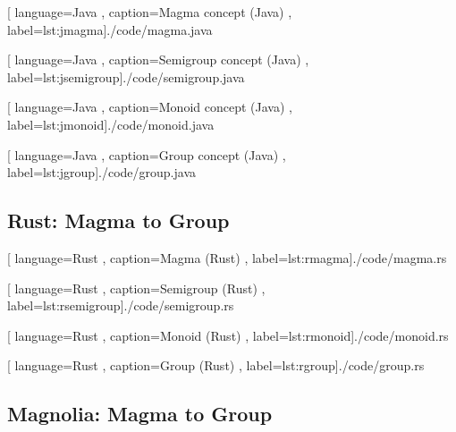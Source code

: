 \begin{center}
  
    [ language=Java
    , caption={Magma concept (Java)}
    , label=lst:jmagma]{./code/magma.java}
\end{center}

\begin{center}
  
    [ language=Java
    , caption={Semigroup concept (Java)}
    , label=lst:jsemigroup]{./code/semigroup.java}
\end{center}

\begin{center}
  
    [ language=Java
    , caption={Monoid concept (Java)}
    , label=lst:jmonoid]{./code/monoid.java}
\end{center}

\begin{center}
  
    [ language=Java
    , caption={Group concept (Java)}
    , label=lst:jgroup]{./code/group.java}
\end{center}

\subsection{Rust: Magma to Group}


\begin{center}
  
    [ language=Rust
    , caption={Magma (Rust)}
    , label=lst:rmagma]{./code/magma.rs}
\end{center}

\begin{center}
  
    [ language=Rust
    , caption={Semigroup (Rust)}
    , label=lst:rsemigroup]{./code/semigroup.rs}
\end{center}

\begin{center}
  
    [ language=Rust
    , caption={Monoid (Rust)}
    , label=lst:rmonoid]{./code/monoid.rs}
\end{center}

\begin{center}
  
    [ language=Rust
    , caption={Group (Rust)}
    , label=lst:rgroup]{./code/group.rs}
\end{center}

\subsection{Magnolia: Magma to Group}

